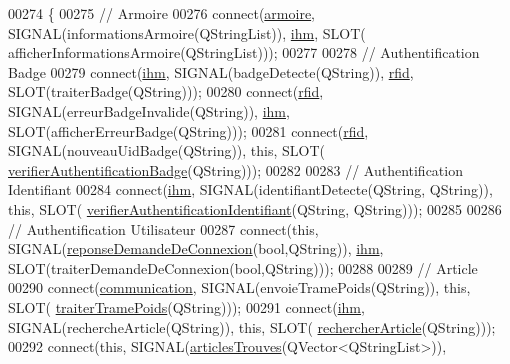 \begin{DoxyCode}
00274 \{
00275     \textcolor{comment}{// Armoire}
00276     connect(\hyperlink{class_supervision_a9f974b5c47899192395e539a0f11034c}{armoire}, SIGNAL(informationsArmoire(QStringList)), \hyperlink{class_supervision_a5aa823c55bf1531497bbb8fdbc6c5528}{ihm}, SLOT(
      afficherInformationsArmoire(QStringList)));
00277 
00278     \textcolor{comment}{// Authentification Badge}
00279     connect(\hyperlink{class_supervision_a5aa823c55bf1531497bbb8fdbc6c5528}{ihm}, SIGNAL(badgeDetecte(QString)), \hyperlink{class_supervision_a3ec5986105208e9a2b02b7e97bf61090}{rfid}, SLOT(traiterBadge(QString)));
00280     connect(\hyperlink{class_supervision_a3ec5986105208e9a2b02b7e97bf61090}{rfid}, SIGNAL(erreurBadgeInvalide(QString)), \hyperlink{class_supervision_a5aa823c55bf1531497bbb8fdbc6c5528}{ihm}, SLOT(afficherErreurBadge(QString)));
00281     connect(\hyperlink{class_supervision_a3ec5986105208e9a2b02b7e97bf61090}{rfid}, SIGNAL(nouveauUidBadge(QString)), \textcolor{keyword}{this}, SLOT(
      \hyperlink{class_supervision_a07e7f0cd8b114182be56ebb5645e62fe}{verifierAuthentificationBadge}(QString)));
00282 
00283     \textcolor{comment}{// Authentification Identifiant}
00284     connect(\hyperlink{class_supervision_a5aa823c55bf1531497bbb8fdbc6c5528}{ihm}, SIGNAL(identifiantDetecte(QString, QString)), \textcolor{keyword}{this}, SLOT(
      \hyperlink{class_supervision_ac596674d302f1f747d65c8334aa1ced9}{verifierAuthentificationIdentifiant}(QString, QString)));
00285 
00286     \textcolor{comment}{// Authentification Utilisateur}
00287     connect(\textcolor{keyword}{this}, SIGNAL(\hyperlink{class_supervision_a116ed6de0e9e3c9c94886235e9f6d6e8}{reponseDemandeDeConnexion}(\textcolor{keywordtype}{bool},QString)), 
      \hyperlink{class_supervision_a5aa823c55bf1531497bbb8fdbc6c5528}{ihm}, SLOT(traiterDemandeDeConnexion(\textcolor{keywordtype}{bool},QString)));
00288 
00289     \textcolor{comment}{// Article}
00290     connect(\hyperlink{class_supervision_a045be64d74de4f7688574eec108220a5}{communication}, SIGNAL(envoieTramePoids(QString)), \textcolor{keyword}{this}, SLOT(
      \hyperlink{class_supervision_ae72bdcb7d70bbb8e13cf61be95ee7c06}{traiterTramePoids}(QString)));
00291     connect(\hyperlink{class_supervision_a5aa823c55bf1531497bbb8fdbc6c5528}{ihm}, SIGNAL(rechercheArticle(QString)), \textcolor{keyword}{this}, SLOT(
      \hyperlink{class_supervision_af2df200be6727338110b81812703d0ae}{rechercherArticle}(QString)));
00292     connect(\textcolor{keyword}{this}, SIGNAL(\hyperlink{class_supervision_a3023468d106abfe7dc697e61a63778ed}{articlesTrouves}(QVector<QStringList>)), 

\end{DoxyCode}
